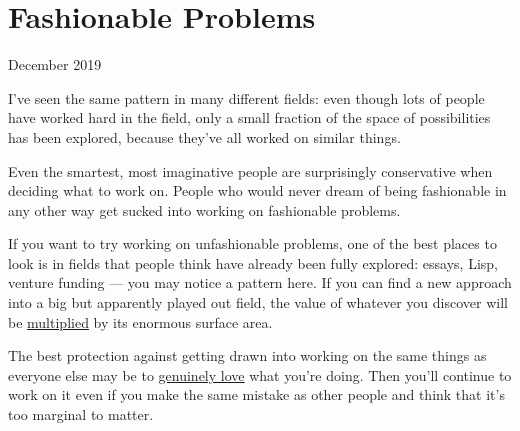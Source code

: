 \chapter{Fashionable Problems}

December 2019

I've seen the same pattern in many different fields: even though lots of
people have worked hard in the field, only a small fraction of the space
of possibilities has been explored, because they've all worked on
similar things.

Even the smartest, most imaginative people are surprisingly conservative
when deciding what to work on. People who would never dream of being
fashionable in any other way get sucked into working on fashionable
problems.

If you want to try working on unfashionable problems, one of the best
places to look is in fields that people think have already been fully
explored: essays, Lisp, venture funding --- you may notice a pattern
here. If you can find a new approach into a big but apparently played
out field, the value of whatever you discover will be
\href{sun.html}{multiplied} by its enormous surface area.

The best protection against getting drawn into working on the same
things as everyone else may be to \href{genius.html}{genuinely love}
what you're doing. Then you'll continue to work on it even if you make
the same mistake as other people and think that it's too marginal to
matter.